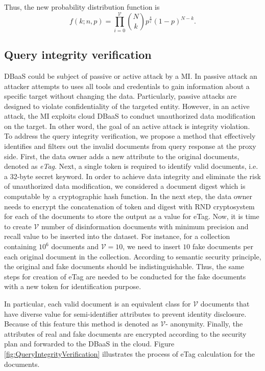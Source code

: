 Thus, the new probability distribution function is
\begin{equation}
\label{attibutesFromDilutedDB}
f(k;n,p) = \prod_{i=0}^{\mathcal{V}} {{N} \choose {k}}p^{\frac{k}{i}}(1-p)^{N-k}.
\end{equation}

\subsection{Query integrity verification}
\label{QueryintegrityVerificationSubSec}
DBaaS could be subject of passive or active attack by a MI. In passive attack an attacker attempts to uses all tools and credentials to gain information about a specific target without changing the data. Particularly, passive attacks are designed to violate confidentiality of the targeted entity. However, in an active attack, the MI exploits cloud DBaaS to conduct unauthorized data modification on the target. In other word, the goal of an active attack is integrity violation.\\

To address the query integrity verification, we propose a method that effectively identifies and filters out the invalid documents from query response at the proxy side. First, the data owner adds a new attribute to the original documents, denoted as \emph{eTag}. Next, a single token is required to identify valid documents, i.e. a 32-byte secret keyword. In order to achieve data integrity and eliminate the risk of unauthorized data modification, we considered a document digest which is computable by a cryptographic hash function. In the next step, the data owner needs to encrypt the concatenation of token and digest with RND cryptosystem for each of the documents to store the output as a value for eTag. Now, it is time to create $\mathcal{V}$ number of disinformation documents with minimum precision and recall value to be inserted into the dataset. For instance, for a collection containing $10^6$ documents and $\mathcal{V}=10$, we need to insert $10$ fake documents per each original document in the collection. According to semantic security principle, the original and fake documents should be indistinguishable. Thus, the same steps for creation of eTag are needed to be conducted for the fake documents with a new token for identification purpose.

In particular, each valid document is an equivalent class for $\mathcal{V}$ documents that have diverse value for semi-identifier attributes to prevent identity disclosure. Because of this feature this method is denoted as $\mathcal{V}$- anonymity. Finally, the attributes of real and fake documents are encrypted according to the security plan and forwarded to the DBaaS in the cloud. Figure \ref{fig:QueryIntegrityVerification} illustrates the process of eTag calculation for the documents.

